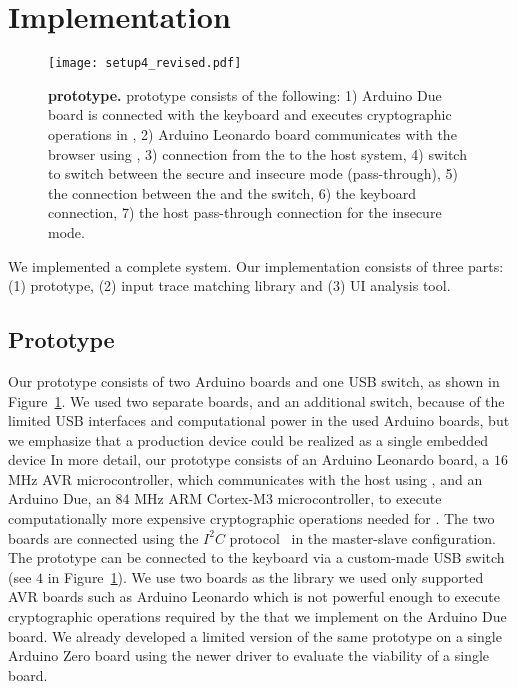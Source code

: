 \section{Implementation}
\label{sec:implementation}

\begin{figure}[t]
  \centering
    \texttt{[image: setup4\_revised.pdf]}
    \caption{\textbf{\device prototype.} \device prototype consists of the following: 1) Arduino Due board is connected with the keyboard and executes cryptographic operations in \tls, 2) Arduino Leonardo board communicates with the browser using \webusb, 3) \usb connection from the \device to the host system, 4) \usb switch to switch between the secure and insecure mode (pass-through), 5) the connection between the \device and the \usb switch, 6) the keyboard connection, 7) the host pass-through connection for the insecure mode.}
    \label{fig:setup}
\end{figure}

We implemented a complete \name system. Our implementation consists of three parts: (1) \device prototype, (2) \server input trace matching library and (3) \tool UI analysis tool. 

\subsection{\device Prototype} 

Our \device prototype consists of two Arduino boards and one USB switch, as shown in Figure~\ref{fig:setup}. We used two separate boards, and an additional switch, because of the limited USB interfaces and computational power in the used Arduino boards, but we emphasize that a production device could be realized as a single embedded device
In more detail, our \device prototype consists of an Arduino Leonardo board, a $16$ MHz AVR microcontroller, which communicates with the host using \webusb, and an Arduino Due, an $84$ MHz ARM Cortex-M3 microcontroller, to execute computationally more expensive cryptographic operations needed for \tls. The two boards are connected using the $I^2C$ protocol~\cite{i2c} in the master-slave configuration. The prototype can be connected to the keyboard via a custom-made USB switch (see $4$ in Figure~\ref{fig:setup}). We use two boards as the \webusb library we used only supported AVR boards such as Arduino Leonardo which is not powerful enough to execute cryptographic operations required by the \tls that we implement on the Arduino Due board. We already developed a limited version of the same prototype on a single Arduino Zero board using the newer driver to evaluate the viability of a single board.

